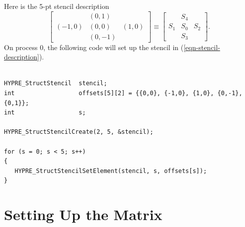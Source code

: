 Here is the 5-pt stencil description
\begin{equation}\label{eqn-stencil-description}
\left [
\begin{array}{ccc}
        & ( 0, 1) &         \\
(-1, 0) & ( 0, 0) & ( 1, 0) \\
        & ( 0,-1) &        
\end{array}
\right ]
\equiv
\left [
\begin{array}{ccc}
    & S_4 &     \\
S_1 & S_0 & S_2 \\
    & S_3 &    
\end{array}
\right ] .
\end{equation}
On process 0, the following code will set up the stencil in
(\ref{eqn-stencil-description}).
\begin{display}
\begin{verbatim}

HYPRE_StructStencil  stencil;
int                  offsets[5][2] = {{0,0}, {-1,0}, {1,0}, {0,-1}, {0,1}};
int                  s;

HYPRE_StructStencilCreate(2, 5, &stencil);

for (s = 0; s < 5; s++)
{
   HYPRE_StructStencilSetElement(stencil, s, offsets[s]);
}

\end{verbatim}
\end{display}


\section{Setting Up the Matrix}
\label{Setting Up the Matrix}

